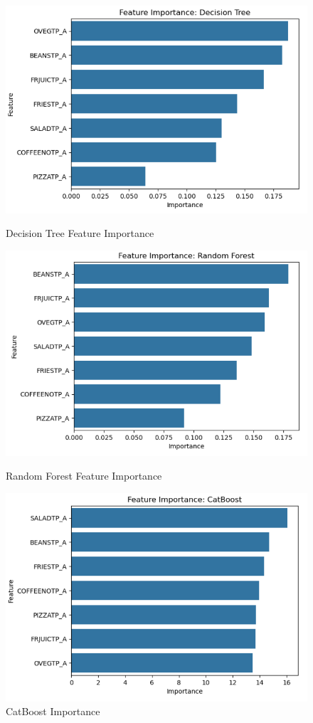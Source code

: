 \documentclass{article}
\begin{document}
\begin{figure}[h!]
	\centering
	\begin{minipage}{0.32\textwidth}
		\centering
		\includegraphics[width=0.9\linewidth]{../Image/P51.jpg}
		\caption{Decision Tree Feature Importance}
		\label{fig:P51}
	\end{minipage}\hfill
	\begin{minipage}{0.32\textwidth}
		\centering
		\includegraphics[width=0.9\linewidth]{../Image/P52.jpg}
		\caption{Random Forest Feature Importance}
		\label{fig:P52}
	\end{minipage}\hfill
	\begin{minipage}{0.32\textwidth}
		\centering
		\includegraphics[width=0.9\linewidth]{../Image/P53.jpg}
		\caption{CatBoost Importance}
		\label{fig:P53}
	\end{minipage}
\end{figure}
\end{document}
